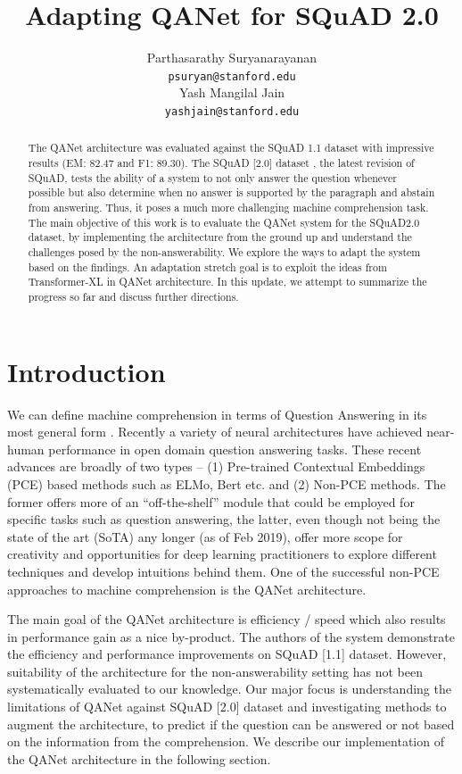 \documentclass{article}
\title{Adapting QANet for SQuAD 2.0}
\author{%
  Parthasarathy Suryanarayanan\\
   \texttt{psuryan@stanford.edu} \\
  \And
  Yash Mangilal Jain\\
  \texttt{yashjain@stanford.edu} \\
}
\begin{document}

\maketitle

\begin{abstract}
The QANet architecture \cite{yu2018qanet} was evaluated against the SQuAD 1.1 dataset \citep{rajpurkar2016squad} with impressive results (EM: 82.47 and F1: 89.30). The SQuAD [2.0] dataset \cite{rajpurkar2018know}, the latest revision of SQuAD, tests the ability of a system to not only answer the question whenever possible but also determine when no answer is supported by the paragraph and abstain from answering. Thus, it poses a much more challenging machine comprehension task. The main objective of this work is to evaluate the QANet system for the SQuAD2.0 dataset, by implementing the architecture from the ground up and understand the challenges posed by the non-answerability. We explore the ways to adapt the system based on the findings. An adaptation stretch goal is to exploit the ideas from Transformer-XL\cite{dai2019transformerxl} in QANet architecture. In this update, we attempt to summarize the progress so far and discuss further directions.
\end{abstract}

\section{Introduction}
We can define machine comprehension in terms of Question Answering in its most general form \cite{burges2013towards}.  Recently a variety of neural architectures have achieved near-human performance in open domain question answering tasks. These recent advances are broadly of two types – (1) Pre-trained Contextual Embeddings (PCE) based methods such as ELMo\cite{peters2018deep}, Bert\cite{devlin2018bert} etc. and (2) Non-PCE methods. The former offers more of an “off-the-shelf” module that could be employed for specific tasks such as question answering, the latter, even though not being the state of the art (SoTA) any longer (as of Feb 2019), offer more scope for creativity and opportunities for deep learning practitioners to explore different techniques and develop intuitions behind them. One of the successful non-PCE approaches to machine comprehension is the QANet architecture.  

The main goal of the QANet architecture is efficiency / speed which also results in performance gain as a nice by-product. The authors of the system demonstrate the efficiency and performance improvements on SQuAD [1.1] dataset. However, suitability of the architecture for the non-answerability setting has not been systematically evaluated to our knowledge. Our major focus is understanding the limitations of QANet against SQuAD [2.0] dataset and investigating methods to augment the architecture, to predict if the question can be answered or not based on the information from the comprehension. We describe our implementation of the QANet architecture in the following section.
\end{document}
